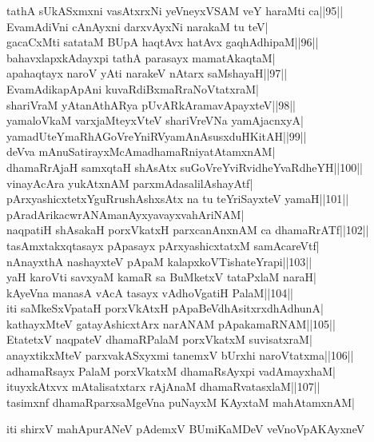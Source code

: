 \documentclass{article}
\begin{document}
tathA sUkASxmxni vasAtxrxNi yeVneyxVSAM veY haraMti ca||95||\\
EvamAdiVni cAnAyxni darxvAyxNi narakaM tu teV|\\
gacaCxMti satataM BUpA haqtAvx hatAvx gaqhAdhipaM||96||\\
bahavxlapxkAdayxpi tathA parasayx mamatAkaqtaM|\\
apahaqtayx naroV yAti narakeV nAtarx saMshayaH||97||\\
EvamAdikapApAni kuvaRdiBxmaRraNoVtatxraM|\\
shariVraM yAtanAthARya pUvARkAramavApayxteV||98||\\
yamaloVkaM varxjaMteyxVteV shariVreVNa yamAjacnxyA|\\
yamadUteYmaRhAGoVreYniRVyamAnAsusxduHKitAH||99||\\
deVva mAnuSatirayxMcAmadhamaRniyatAtamxnAM|\\
dhamaRrAjaH samxqtaH shAsAtx suGoVreYviRvidheYvaRdheYH||100||\\
vinayAcAra yukAtxnAM parxmAdasalilAshayAtf|\\
pArxyashicxtetxYguRrushAshxsAtx na tu teYriSayxteV yamaH||101||\\
pAradArikacwrANAmanAyxyavayxvahAriNAM|\\
naqpatiH shAsakaH porxVkatxH parxcanAnxnAM ca dhamaRrATf||102||\\
tasAmxtakxqtasayx pApasayx pArxyashicxtatxM samAcareVtf|\\
nAnayxthA nashayxteV pApaM kalapxkoVTishateYrapi||103||\\
yaH karoVti savxyaM kamaR sa BuMketxV tataPxlaM naraH|\\
kAyeVna manasA vAcA tasayx vAdhoVgatiH PalaM||104||\\
iti saMkeSxVpataH porxVkAtxH pApaBeVdhAsitxrxdhAdhunA|\\
kathayxMteV gatayAshicxtArx narANAM pApakamaRNAM||105||\\
EtatetxV naqpateV dhamaRPalaM porxVkatxM suvisatxraM|\\
anayxtikxMteV parxvakASxyxmi tanemxV bUrxhi naroVtatxma||106||\\
adhamaRsayx PalaM porxVkatxM dhamaRsAyxpi vadAmayxhaM|\\
ituyxkAtxvx mAtalisatxtarx rAjAnaM dhamaRvatasxlaM||107||\\
tasimxnf dhamaRparxsaMgeVna puNayxM KAyxtaM mahAtamxnAM|

\begin{center}
iti shirxV mahApurANeV pAdemxV BUmiKaMDeV veVnoVpAKAyxneV
\end{center}
\end{document}
